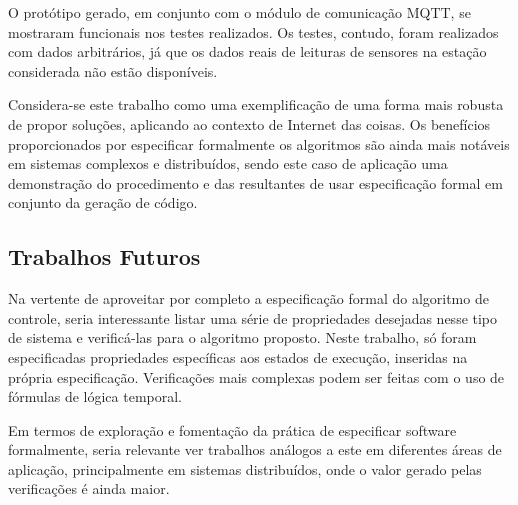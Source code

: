 \documentclass[12pt]{article}
\begin{document}
O protótipo gerado, em conjunto com o módulo de comunicação MQTT, se mostraram
funcionais nos testes realizados. Os testes, contudo, foram realizados com dados
arbitrários, já que os dados reais de leituras de sensores na estação
considerada não estão disponíveis.

Considera-se este trabalho como uma exemplificação de uma forma mais robusta de
propor soluções, aplicando ao contexto de Internet das coisas. Os benefícios
proporcionados por especificar formalmente os algoritmos são ainda mais notáveis
em sistemas complexos e distribuídos, sendo este caso de aplicação uma
demonstração do procedimento e das resultantes de usar especificação formal em
conjunto da geração de código.

\subsection{Trabalhos Futuros}

Na vertente de aproveitar por completo a especificação formal do algoritmo de
controle, seria interessante listar uma série de propriedades desejadas nesse
tipo de sistema e verificá-las para o algoritmo proposto. Neste trabalho, só
foram especificadas propriedades específicas aos estados de execução, inseridas
na própria especificação. Verificações mais complexas podem ser feitas com o uso
de fórmulas de lógica temporal.

Em termos de exploração e fomentação da prática de especificar software
formalmente, seria relevante ver trabalhos análogos a este em diferentes áreas
de aplicação, principalmente em sistemas distribuídos, onde o valor gerado pelas
verificações é ainda maior.


\nocite{*}

\end{document}
